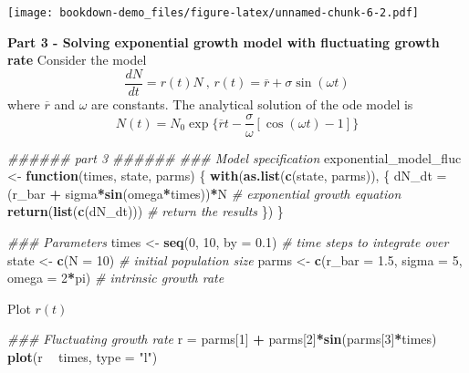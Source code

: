 \documentclass[
]{book}
\newenvironment{Shaded}{\begin{snugshade}}{\end{snugshade}}
\newcommand{\CommentTok}[1]{\textcolor[rgb]{0.56,0.35,0.01}{\textit{#1}}}
\newcommand{\ControlFlowTok}[1]{\textcolor[rgb]{0.13,0.29,0.53}{\textbf{#1}}}
\newcommand{\DataTypeTok}[1]{\textcolor[rgb]{0.13,0.29,0.53}{#1}}
\newcommand{\DecValTok}[1]{\textcolor[rgb]{0.00,0.00,0.81}{#1}}
\newcommand{\FloatTok}[1]{\textcolor[rgb]{0.00,0.00,0.81}{#1}}
\newcommand{\KeywordTok}[1]{\textcolor[rgb]{0.13,0.29,0.53}{\textbf{#1}}}
\newcommand{\NormalTok}[1]{#1}
\newcommand{\OperatorTok}[1]{\textcolor[rgb]{0.81,0.36,0.00}{\textbf{#1}}}
\newcommand{\StringTok}[1]{\textcolor[rgb]{0.31,0.60,0.02}{#1}}
\begin{document}
\texttt{[image: bookdown-demo\_files/figure-latex/unnamed-chunk-6-2.pdf]}

\textbf{Part 3 - Solving exponential growth model with fluctuating growth rate}
Consider the model
\[
\frac{dN}{dt} = r(t)N \ \text{, } r(t) = \overline{r} + \sigma\sin(\omega t)
\]
where \(\overline{r}\) and \(\omega\) are constants.
The analytical solution of the ode model is
\[
N(t) = N_0\exp\{\overline{r}t - \frac{\sigma}{\omega}[\cos(\omega t) - 1]\}
\]

\begin{Shaded}
\begin{Highlighting}[]
\CommentTok{###### part 3 ######}
\CommentTok{### Model specification}
\NormalTok{exponential_model_fluc <-}\StringTok{ }\ControlFlowTok{function}\NormalTok{(times, state, parms) \{}
  \KeywordTok{with}\NormalTok{(}\KeywordTok{as.list}\NormalTok{(}\KeywordTok{c}\NormalTok{(state, parms)), \{}
\NormalTok{    dN_dt =}\StringTok{ }\NormalTok{(r_bar }\OperatorTok{+}\StringTok{ }\NormalTok{sigma}\OperatorTok{*}\KeywordTok{sin}\NormalTok{(omega}\OperatorTok{*}\NormalTok{times))}\OperatorTok{*}\NormalTok{N  }\CommentTok{# exponential growth equation}
    \KeywordTok{return}\NormalTok{(}\KeywordTok{list}\NormalTok{(}\KeywordTok{c}\NormalTok{(dN_dt)))  }\CommentTok{# return the results}
\NormalTok{  \})}
\NormalTok{\}}
\end{Highlighting}
\end{Shaded}

\begin{Shaded}
\begin{Highlighting}[]
\CommentTok{### Parameters}
\NormalTok{times <-}\StringTok{ }\KeywordTok{seq}\NormalTok{(}\DecValTok{0}\NormalTok{, }\DecValTok{10}\NormalTok{, }\DataTypeTok{by =} \FloatTok{0.1}\NormalTok{)  }\CommentTok{# time steps to integrate over}
\NormalTok{state <-}\StringTok{ }\KeywordTok{c}\NormalTok{(}\DataTypeTok{N =} \DecValTok{10}\NormalTok{)  }\CommentTok{# initial population size}
\NormalTok{parms <-}\StringTok{ }\KeywordTok{c}\NormalTok{(}\DataTypeTok{r_bar =} \FloatTok{1.5}\NormalTok{, }\DataTypeTok{sigma =} \DecValTok{5}\NormalTok{, }\DataTypeTok{omega =} \DecValTok{2}\OperatorTok{*}\NormalTok{pi)  }\CommentTok{# intrinsic growth rate}
\end{Highlighting}
\end{Shaded}

Plot \(r(t)\)

\begin{Shaded}
\begin{Highlighting}[]
\CommentTok{### Fluctuating growth rate}
\NormalTok{r =}\StringTok{ }\NormalTok{parms[}\DecValTok{1}\NormalTok{] }\OperatorTok{+}\StringTok{ }\NormalTok{parms[}\DecValTok{2}\NormalTok{]}\OperatorTok{*}\KeywordTok{sin}\NormalTok{(parms[}\DecValTok{3}\NormalTok{]}\OperatorTok{*}\NormalTok{times)}
\KeywordTok{plot}\NormalTok{(r }\OperatorTok{~}\StringTok{ }\NormalTok{times, }\DataTypeTok{type =} \StringTok{"l"}\NormalTok{)}
\end{Highlighting}
\end{Shaded}
\end{document}
